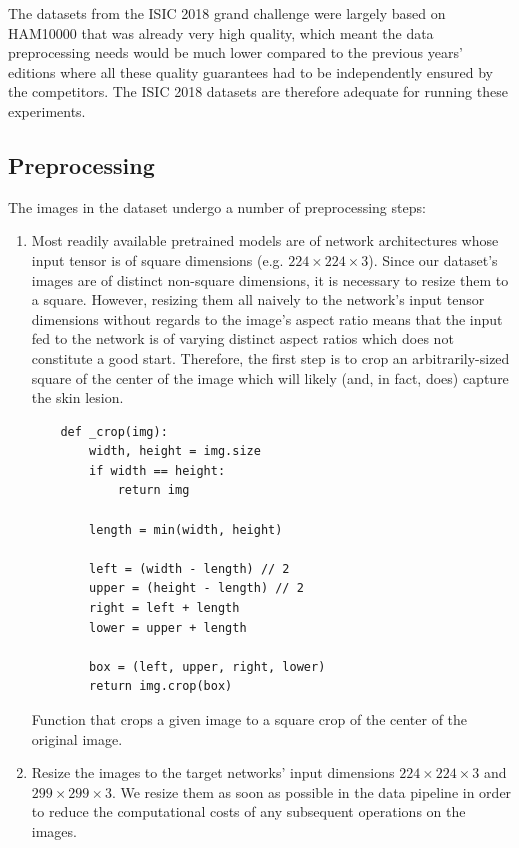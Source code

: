 The datasets from the \ac{ISIC} 2018 grand challenge \cite{isic2018} were largely based on \ac{HAM10000} that was already very high quality, which meant the data preprocessing needs would be much lower compared to the previous years' editions where all these quality guarantees had to be independently ensured by the competitors. The \ac{ISIC} 2018 datasets are therefore adequate for running these experiments.

\subsection{Preprocessing}
\label{subsection:preprocessing}

The images in the dataset undergo a number of preprocessing steps:

\begin{enumerate}
    \item Most readily available pretrained models are of network architectures whose input tensor is of square dimensions (e.g. $224 \times 224 \times 3$). Since our dataset's images are of distinct non-square dimensions, it is necessary to resize them to a square. However, resizing them all naively to the network's input tensor dimensions without regards to the image's aspect ratio means that the input fed to the network is of varying distinct aspect ratios which does not constitute a good start. Therefore, the first step is to crop an arbitrarily-sized square of the center of the image which will likely (and, in fact, does) capture the skin lesion.

    \begin{listing}[ht]
    \begin{verbatim}
    def _crop(img):
        width, height = img.size
        if width == height:
            return img

        length = min(width, height)

        left = (width - length) // 2
        upper = (height - length) // 2
        right = left + length
        lower = upper + length

        box = (left, upper, right, lower)
        return img.crop(box)
    \end{verbatim}
    \caption{Function that crops a given image to a square crop of the center of the original image.}
    \label{code:crop}
    \end{listing}

\item Resize the images to the target networks' input dimensions $224 \times 224 \times 3$ and $299 \times 299 \times 3$. We resize them as soon as possible in the data pipeline in order to reduce the computational costs of any subsequent operations on the images.


\end{enumerate}
